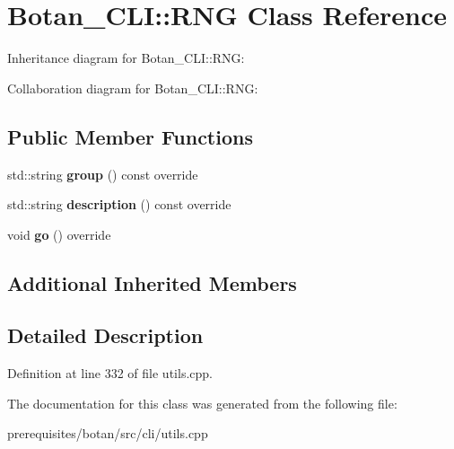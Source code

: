 \hypertarget{class_botan___c_l_i_1_1_r_n_g}{}\section{Botan\+\_\+\+C\+LI\+:\+:R\+NG Class Reference}
\label{class_botan___c_l_i_1_1_r_n_g}


Inheritance diagram for Botan\+\_\+\+C\+LI\+:\+:R\+NG\+:


Collaboration diagram for Botan\+\_\+\+C\+LI\+:\+:R\+NG\+:
\subsection*{Public Member Functions}
\begin{DoxyCompactItemize}
\item 
\mbox{\label{class_botan___c_l_i_1_1_r_n_g_acb33c0a57545df3508578c32ba83cc80}} 
std\+::string {\bfseries group} () const override
\item 
\mbox{\label{class_botan___c_l_i_1_1_r_n_g_a7020a1919e46b9e07deb09c80a3a29fc}} 
std\+::string {\bfseries description} () const override
\item 
\mbox{\label{class_botan___c_l_i_1_1_r_n_g_a4db0e0773cc89aecabc38b12c3b8d714}} 
void {\bfseries go} () override
\end{DoxyCompactItemize}
\subsection*{Additional Inherited Members}


\subsection{Detailed Description}


Definition at line 332 of file utils.\+cpp.



The documentation for this class was generated from the following file\+:\begin{DoxyCompactItemize}
\item 
prerequisites/botan/src/cli/utils.\+cpp\end{DoxyCompactItemize}
